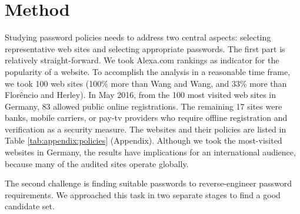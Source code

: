 \section{Method}
Studying password policies needs to address two central aspects: selecting representative web sites and selecting appropriate passwords. The first part is relatively straight-forward. We took Alexa.com rankings as indicator for the popularity of a website. To accomplish the analysis in a reasonable time frame, we took 100 web sites (100\% more than Wang and Wang, and 33\% more than Florêncio and Herley). In May 2016, from the 100 most visited web sites in Germany, 83 allowed public online registrations. The remaining 17 sites were banks, mobile carriers, or pay-tv providers who require offline registration and verification as a security measure. The websites and their policies are listed in Table \ref{tab:appendix:policies} (Appendix). Although we took the most-visited websites in Germany, the results have implications for an international audience, because many of the audited sites operate globally.

The second challenge is finding suitable passwords to reverse-engineer password requirements. We approached this task in two separate stages to find a good candidate set. 

